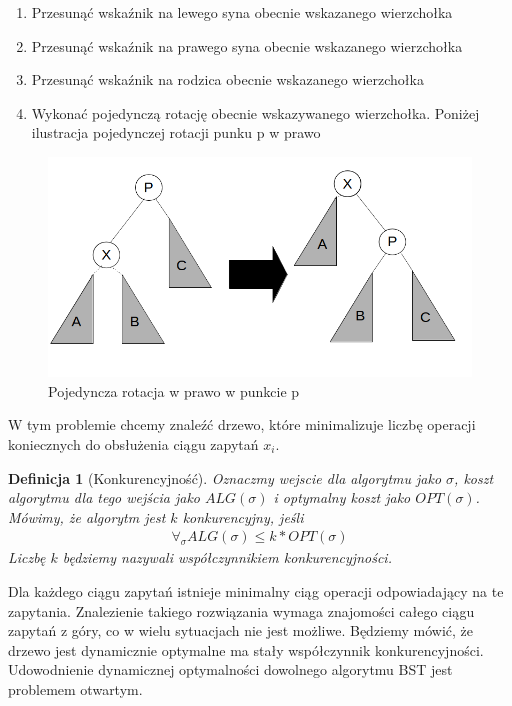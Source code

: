 \documentclass[declaration,shortabstract]{iithesis}
\newcounter{thm}[section]
\theoremstyle{thm}
\newtheorem{definition}[thm]{Definicja}
\theoremstyle{remark}
\theoremstyle{plain}
\theoremstyle{plain}
\theoremstyle{plain}
\begin{document}
\begin{enumerate}   

\item {Przesunąć wskaźnik na lewego syna obecnie wskazanego wierzchołka}   

\item {Przesunąć wskaźnik na prawego syna obecnie wskazanego wierzchołka}   

\item {Przesunąć wskaźnik na rodzica obecnie wskazanego wierzchołka}   

\item {Wykonać pojedynczą rotację obecnie wskazywanego wierzchołka. Poniżej ilustracja pojedynczej rotacji punku p w prawo}    

\end{enumerate}   
\begin{figure}[H]
\centering    
\includegraphics[scale = 0.5]{zig.png}  
\caption{Pojedyncza rotacja w prawo w punkcie p} 
 \label{fig:1} 
\end{figure}  

 
W tym problemie chcemy znaleźć drzewo, które minimalizuje liczbę operacji koniecznych do obsłużenia ciągu zapytań \(x_i\). 

\begin{definition}[Konkurencyjność]
Oznaczmy wejscie dla algorytmu jako \(\sigma\), koszt algorytmu dla tego wejścia jako \(ALG(\sigma)\) i optymalny koszt jako \(OPT(\sigma)\).
Mówimy, że algorytm jest $k$ konkurencyjny, jeśli
\begin{align*}
\forall_{\sigma} ALG(\sigma) \leq k*OPT(\sigma)
\end{align*}
Liczbę $k$ będziemy nazywali współczynnikiem konkurencyjności.
\end{definition}  

Dla każdego ciągu zapytań istnieje minimalny ciąg operacji odpowiadający na te zapytania. Znalezienie takiego rozwiązania wymaga znajomości całego ciągu zapytań z góry, co w wielu sytuacjach nie jest możliwe. Będziemy mówić, że drzewo jest dynamicznie optymalne ma stały współczynnik konkurencyjności. Udowodnienie dynamicznej optymalności dowolnego algorytmu BST jest problemem otwartym.   
\end{document}
